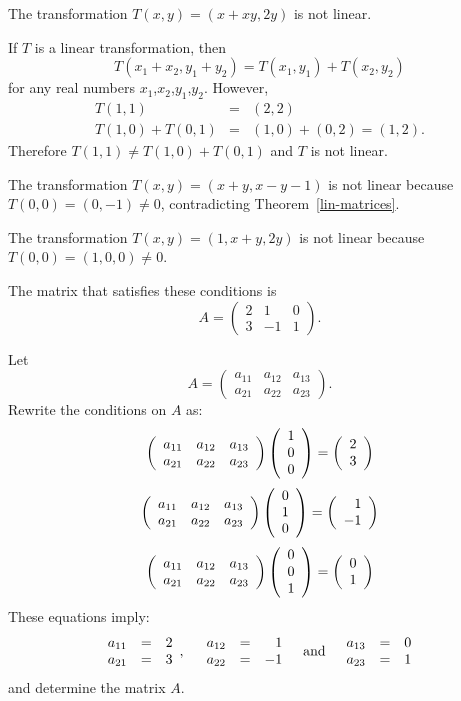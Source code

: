 \documentclass{ximera}
\begin{document}
 \ans The transformation $T(x,y) = (x + xy, 2y)$ is not linear.

\soln If $T$ is a linear transformation, then
\[
T(x_1 + x_2,y_1 + y_2) = T(x_1,y_1) + T(x_2,y_2)
\]
for any real numbers $x_1$,$x_2$,$y_1$,$y_2$.  However,
\[
\begin{array}{rcl}
T(1,1) & = & (2,2) \\
T(1,0) + T(0,1) & = & (1,0) + (0,2) = (1,2).\end{array}
\]
Therefore $T(1,1) \neq T(1,0) + T(0,1)$ and $T$ is not linear.

 The transformation $T(x,y) = (x + y, x - y - 1)$
is not linear because $T(0,0) = (0,-1) \neq 0$, contradicting
Theorem~\ref{lin-matrices}.

 The transformation $T(x,y) = (1,x + y, 2y)$ is not linear
because $T(0,0) = (1,0,0) \neq 0$.

\ans The matrix that satisfies these conditions is
\[
A = \left(\begin{array}{rrr} 2 & 1 & 0 \\ 3 & -1 & 1
\end{array}\right).
\]

\soln Let
\[
A = \left(\begin{array}{rrr}
a_{11} & a_{12} & a_{13} \\ a_{21} & a_{22} & a_{23}
\end{array}\right).
\]
Rewrite the conditions on $A$ as:
\[
\left(\begin{array}{rrr}
a_{11} & a_{12} & a_{13} \\ a_{21} & a_{22} & a_{23}
\end{array}\right) \left(\begin{array}{r} 1 \\ 0 \\ 0\end{array}\right) = \left(\begin{array}{r} 2 \\ 3\end{array}\right)
\]
\[
\left(\begin{array}{rrr}
a_{11} & a_{12} & a_{13} \\ a_{21} & a_{22} & a_{23}
\end{array}\right) \left(\begin{array}{r} 0 \\ 1 \\ 0\end{array}\right) = \left(\begin{array}{r} 1 \\ -1\end{array}\right)
\]
\[
\left(\begin{array}{rrr}
a_{11} & a_{12} & a_{13} \\ a_{21} & a_{22} & a_{23}
\end{array}\right) \left(\begin{array}{r} 0 \\ 0 \\ 1\end{array}\right) = \left(\begin{array}{r} 0 \\ 1\end{array}\right)
\]
These equations imply:
\[ \begin{array}{rcl} a_{11} & = & 2 \\ a_{21} & = & 3 \end{array},
\quad
\begin{array}{rcr} a_{12} & = & 1 \\ a_{22} & = & -1 \end{array}
\quad\mbox{and}\quad
\begin{array}{rcl} a_{13} & = & 0 \\ a_{23} & = & 1 \end{array}
\]
and determine the matrix $A$.
\end{document}
